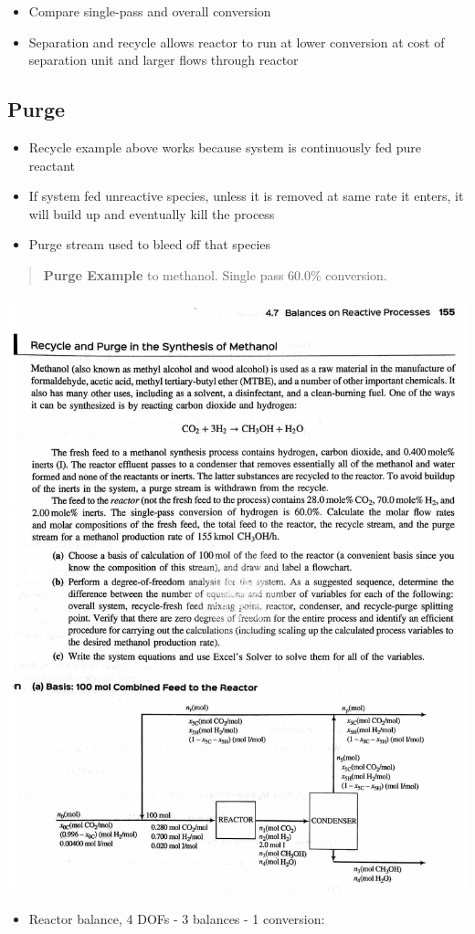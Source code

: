 \documentclass[11pt]{article}
\begin{document}
\begin{itemize}
\item Compare single-pass and overall conversion
\item Separation and recycle allows reactor to run at lower conversion at cost of separation unit and larger flows through reactor
\end{itemize}

\subsection{Purge}
\label{sec-6-7}
\begin{itemize}
\item Recycle example above works because system is continuously fed pure reactant
\item If system fed unreactive species, unless it is removed at same rate it enters, it will build up and eventually kill the process
\item Purge stream used to bleed off that species
\end{itemize}

\begin{quote}
\textbf{Purge Example}   to methanol.  Single pass 60.0\%  conversion.
\end{quote}
\includegraphics[width=.9\linewidth]{./figs/Purge.png}
\begin{itemize}
\item Reactor balance, 4 DOFs - 3 balances - 1 conversion:
\end{itemize}
\end{document}

